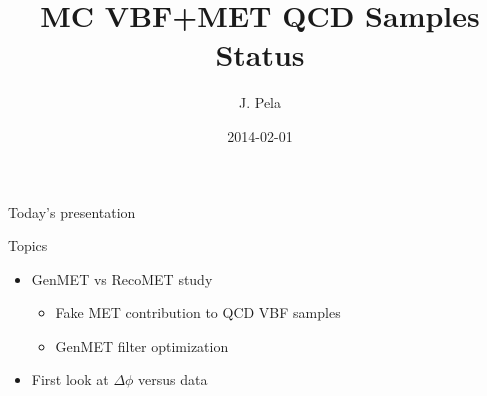 \documentclass[8pt]{beamer}
\author[João Pela]{J. Pela}
\title[]{MC VBF+MET QCD Samples Status}
\institute{Imperial College London}
\date{2014-02-01}
\begin{document}
\setlength{\unitlength}{1mm}

\begin{frame}
  \titlepage
\end{frame}

\begin{frame}{Today's presentation}
 
\begin{block}{Topics}
 
\begin{itemize}
  \item GenMET vs RecoMET study
  \begin{itemize}
    \item Fake MET contribution to QCD VBF samples
    \item GenMET filter optimization
  \end{itemize}
  \item First look at $\Delta\phi$ versus data
\end{itemize}
 
\end{block}
 
\end{frame}
\end{document}
